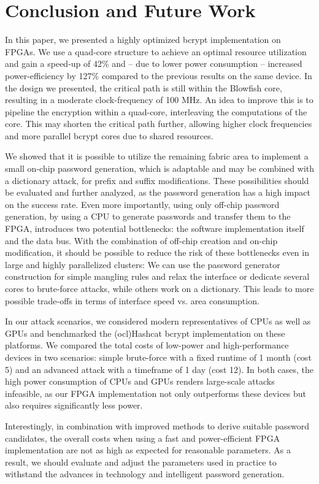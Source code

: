 
\section{Conclusion and Future Work}
\label{sec:conclusion}
In this paper, we presented a highly optimized bcrypt implementation on FPGAs.
We use a quad-core structure to achieve an optimal resource utilization and gain
a speed-up of 42\% and -- due to lower power consumption -- increased
power-efficiency by 127\% compared to the previous results on the same device.
In the design we presented, the critical path is still within the Blowfish core,
resulting in a moderate clock-frequency of 100 MHz. An idea to improve this is to
pipeline the encryption within a quad-core, interleaving the computations of the
core. This may shorten the critical path further, allowing higher clock
frequencies and more parallel bcrypt cores due to shared resources.

We showed that it is possible to utilize the remaining fabric area to
implement a small on-chip password generation, which is adaptable and may be
combined with a dictionary attack, \eg for prefix and suffix modifications.
These possibilities should be evaluated and further analyzed, as the password
generation has a high impact on the success rate. Even more importantly, using
only off-chip password generation, \ie by using a CPU to generate passwords and transfer
them to the FPGA, introduces two potential bottlenecks: the software
implementation itself and the data bus. With the combination of off-chip
creation and on-chip modification, it should be possible to reduce the risk of these
bottlenecks even in large and highly parallelized clusters: We can use the password
generator construction for simple mangling rules and relax the interface or
dedicate several cores to brute-force attacks, while others work on a dictionary.
This leads to more possible trade-offs in terms of interface speed vs. area
consumption.

In our attack scenarios, we considered modern representatives of CPUs as well as
GPUs and benchmarked the (ocl)Hashcat bcrypt implementation on these platforms.
We compared the total costs of low-power and high-performance devices in two
scenarios: simple brute-force with a fixed runtime of 1 month (cost 5) and an
advanced attack with a timeframe of 1 day (cost 12). In both cases, the high
power consumption of CPUs and GPUs renders large-scale attacks infeasible, as
our FPGA implementation not only outperforms these devices but also requires
significantly less power. 

Interestingly, in combination with improved methods to derive suitable password
candidates, the overall costs when using a fast and power-efficient FPGA
implementation are not as high as expected for reasonable parameters.  As a
result, we should evaluate and adjust the parameters used in practice to
withstand the advances in technology and intelligent password generation.
